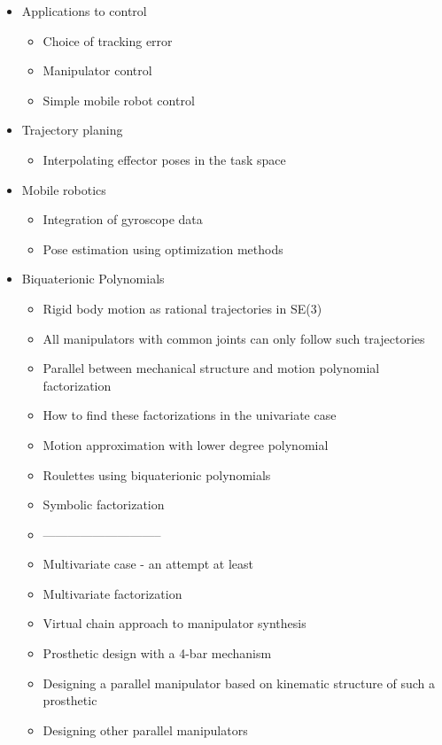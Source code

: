 \begin{itemize}
       \item Applications to control 
           \begin{itemize}
                   \item Choice of tracking error
                   \item Manipulator control
                   \item Simple mobile robot control
           \end{itemize}
       \item Trajectory planing
           \begin{itemize}
                   \item Interpolating effector poses in the task space
           \end{itemize}
      \item Mobile robotics
          \begin{itemize}
                  \item Integration of gyroscope data
                  \item Pose estimation using optimization methods
          \end{itemize}
      \item Biquaterionic Polynomials
      \begin{itemize}
              \item Rigid body motion as rational trajectories in SE(3)
              \item All manipulators with common joints can only follow such trajectories
              \item Parallel between mechanical structure and motion polynomial factorization
              \item How to find these factorizations in the univariate case
              \item Motion approximation with lower degree polynomial
              \item Roulettes using biquaterionic polynomials
              \item Symbolic factorization
              \item -----------------------------
              \item Multivariate case - an attempt at least
              \item Multivariate factorization
              \item Virtual chain approach to manipulator synthesis
              \item Prosthetic design with a 4-bar mechanism
              \item Designing a parallel manipulator based on kinematic structure of such a prosthetic
              \item Designing other parallel manipulators
      \end{itemize}
        
\end{itemize}




